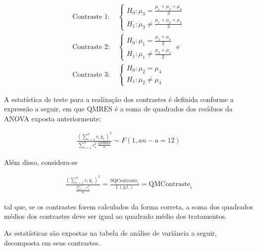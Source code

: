 \documentclass[
]{article}
\begin{document}
\begin{align*}
  \text{Contraste 1: }&\begin{cases}
    H_0: \mu_3 = \frac{\mu_1+\mu_2+\mu_4}{3}\\
    H_1: \mu_3 \neq \frac{\mu_1+\mu_2+\mu_4}{3}
  \end{cases}\\
  \text{Contraste 2: }&\begin{cases}
    H_0: \mu_1 = \frac{\mu_2+\mu_4}{2}\\
    H_1: \mu_1 \neq \frac{\mu_2+\mu_4}{2}
  \end{cases} 
  \text{ e }\\
  \text{Contraste 3: }&\begin{cases}
    H_0: \mu_2 = \mu_4\\
    H_1: \mu_2 \neq \mu_4
  \end{cases}
\end{align*}

A estatística de teste para a realização dos contrastes é definida
conforme a expressão a seguir, em que \(\text{QMRES}\) é a soma de
quadrados dos resíduos da ANOVA exposta anteriormente:

\begin{align}
  \frac{\left( \sum\limits_{i = 1}^n c_i \, \bar{y}_{i.}\right)^2}{ \sum\limits_{i = 1}^n c_i^2 \, \frac{\text{QMRES}}{n}} \sim F(1, an-a = 12)
\end{align}

Além disso, considera-se

\begin{align}
  \frac{\left( \sum\limits_{i = 1}^n c_i \, \bar{y}_{i.}\right)^2}{\frac{\sum\limits_{i = 1}^n c_i^2}{n}} = \frac{\text{SQContraste}_i}{1 \, (g.l.)} = \text{QMContraste}_i
\end{align}

tal que, se os contrastes forem calculados da forma correta, a soma dos
quadrados médios dos contrastes deve ser igual ao quadrado médio dos
tratamentos.

As estatísticas são expostas na tabela de análise de variância a seguir,
decomposta em seus contrastes.
\end{document}

